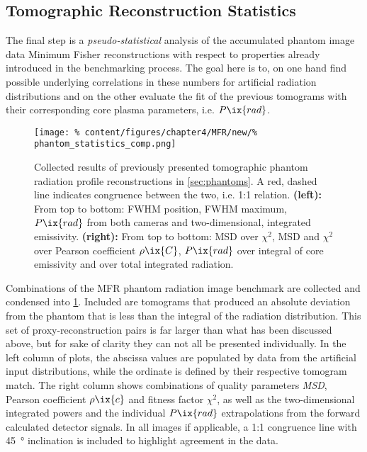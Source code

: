         \subsection{Tomographic Reconstruction Statistics}\label{sec:phantomstat}%
%
            The final step is a \textit{pseudo-statistical} analysis of the accumulated phantom image data Minimum Fisher reconstructions with respect to properties already introduced in the benchmarking process. The goal here is to, on one hand find possible underlying correlations in these numbers for artificial radiation distributions and on the other evaluate the fit of the previous tomograms with their corresponding core plasma parameters, i.e. $P\ix{rad}$.%
%
            \begin{figure}[t]%
                \centering%
                \texttt{[image: \%
                    content/figures/chapter4/MFR/new/\%
                    phantom\_statistics\_comp.png]}%
                \caption{%
                    Collected results of previously presented tomographic phantom radiation profile reconstructions in \cref{sec:phantoms}. A red, dashed line indicates congruence between the two, i.e. 1:1 relation. \textbf{(left):} From top to bottom: FWHM position, FWHM maximum, $P\ix{rad}$ from both cameras and two-dimensional, integrated emissivity. \textbf{(right):} From top to bottom: MSD over $\chi^{2}$, MSD and $\chi^{2}$ over Pearson coefficient $\rho\ix{C}$, $P\ix{rad}$ over integral of core emissivity and over total integrated radiation.}\label{fig:tomo_phantom_statistics}%
            \end{figure}%
%
            Combinations of the MFR phantom radiation image benchmark are collected and condensed into \cref{fig:tomo_phantom_statistics}. Included are tomograms that produced an absolute deviation from the phantom that is less than the integral of the radiation distribution. This set of proxy-reconstruction pairs is far larger than what has been discussed above, but for sake of clarity they can not all be presented individually. In the left column of plots, the abscissa values are populated by data from the artificial input distributions, while the ordinate is defined by their respective tomogram match. The right column shows combinations of quality parameters \textit{MSD}, Pearson coefficient $\rho\ix{c}$ and fitness factor $\chi^{2}$, as well as the two-dimensional integrated powers and the individual $P\ix{rad}$ extrapolations from the forward calculated detector signals. In all images if applicable, a 1:1 congruence line with \SI{45}{\degree} inclination is included to highlight agreement in the data.\\%
